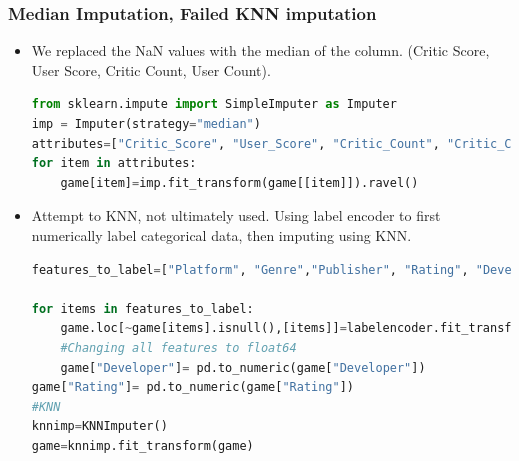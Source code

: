 \begin{frame}[fragile]
    \frametitle{Median Imputation, Failed KNN imputation}
    
    \begin{itemize}
    \item 
    We replaced the NaN values with the median of the column. (Critic Score, User Score, Critic Count, User Count). 
       \begin{lstlisting}[language=Python]
from sklearn.impute import SimpleImputer as Imputer
imp = Imputer(strategy="median")
attributes=["Critic_Score", "User_Score", "Critic_Count", "Critic_Count","User_Count"]
for item in attributes:
    game[item]=imp.fit_transform(game[[item]]).ravel()

      \end{lstlisting}
    \item Attempt to KNN, not ultimately used. 
    Using label encoder to first numerically label categorical data, then imputing using KNN. 
    \begin{lstlisting}[language=Python]
features_to_label=["Platform", "Genre","Publisher", "Rating", "Developer"]

for items in features_to_label:
    game.loc[~game[items].isnull(),[items]]=labelencoder.fit_transform(game.loc[~game[items].isnull(),[items]])
    #Changing all features to float64
    game["Developer"]= pd.to_numeric(game["Developer"])
game["Rating"]= pd.to_numeric(game["Rating"])
#KNN
knnimp=KNNImputer()
game=knnimp.fit_transform(game) 
      \end{lstlisting}


    \end{itemize}
\end{frame}


